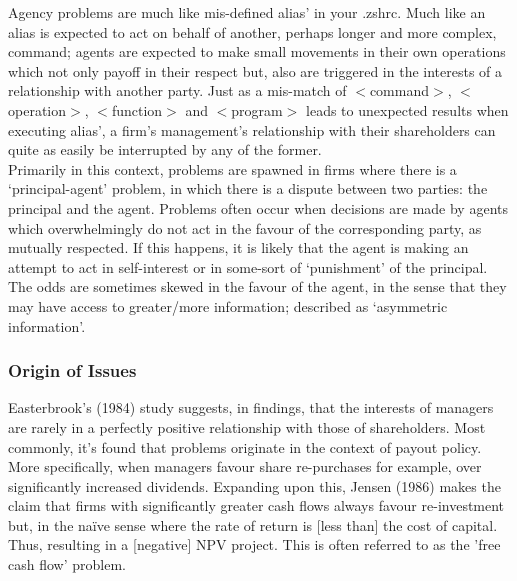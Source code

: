 \documentclass[11pt, english]{article}
\begin{document}
	Agency problems are much like mis-defined alias' in your .zshrc. Much like an alias is expected to act on behalf of another, perhaps longer and more complex, command; agents are expected to make small movements in their own operations which not only payoff in their respect but, also are triggered in the interests of a relationship with another party. Just as a mis-match of $<$command$>$, $<$operation$>$, $<$function$>$ and $<$program$>$ leads to unexpected results when executing alias', a firm's management's relationship with their shareholders can quite as easily be interrupted by any of the former.\\

	Primarily in this context, problems are spawned in firms where there is a `principal-agent' problem, in which there is a dispute between two parties: the principal and the agent. Problems often occur when decisions are made by agents which overwhelmingly do not act in the favour of the corresponding party, as mutually respected. If this happens, it is likely that the agent is making an attempt to act in self-interest or in some-sort of `punishment' of the principal. The odds are sometimes skewed in the favour of the agent, in the sense that they may have access to greater/more information; described as `asymmetric information'.

		\subsubsection*{Origin of Issues}

	Easterbrook's (1984) study suggests, in findings, that the interests of managers are rarely in a perfectly positive relationship with those of shareholders. Most commonly, it's found that problems originate in the context of payout policy. More specifically, when managers favour share re-purchases for example, over significantly increased dividends. Expanding upon this, Jensen (1986) makes the claim that firms with significantly greater cash flows always favour re-investment but, in the naïve sense where the rate of return is [less than] the cost of capital. Thus, resulting in a [negative] NPV project. This is often referred to as the 'free cash flow' problem.\\
\end{document}
